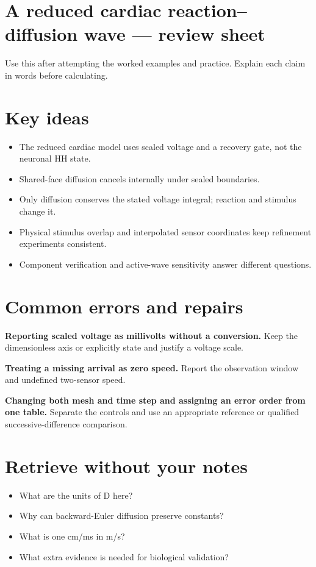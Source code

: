 \documentclass[11pt,letterpaper]{article}
\theoremstyle{definition}\newtheorem{definition}{Definition}\newtheorem{example}{Example}
\numberwithin{equation}{section}
\begin{document}
\section*{A reduced cardiac reaction--diffusion wave --- review sheet}
Use this after attempting the worked examples and practice. Explain each claim in words before calculating.

\section*{Key ideas}
\begin{itemize}
\item The reduced cardiac model uses scaled voltage and a recovery gate, not the neuronal HH state.
\item Shared-face diffusion cancels internally under sealed boundaries.
\item Only diffusion conserves the stated voltage integral; reaction and stimulus change it.
\item Physical stimulus overlap and interpolated sensor coordinates keep refinement experiments consistent.
\item Component verification and active-wave sensitivity answer different questions.
\end{itemize}
\section*{Common errors and repairs}
\textbf{Reporting scaled voltage as millivolts without a conversion.} Keep the dimensionless axis or explicitly state and justify a voltage scale.

\textbf{Treating a missing arrival as zero speed.} Report the observation window and undefined two-sensor speed.

\textbf{Changing both mesh and time step and assigning an error order from one table.} Separate the controls and use an appropriate reference or qualified successive-difference comparison.

\section*{Retrieve without your notes}
\begin{itemize}
\item What are the units of D here?
\item Why can backward-Euler diffusion preserve constants?
\item What is one cm/ms in m/s?
\item What extra evidence is needed for biological validation?
\end{itemize}
\end{document}
